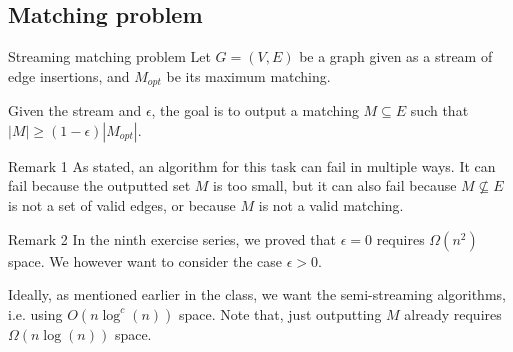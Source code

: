 \documentclass[a4paper]{article}
\begin{document}
\subsection{Matching problem}

\begin{parag}{Streaming matching problem}
    Let $G = \left(V, E\right)$ be a graph given as a stream of edge insertions, and $M_{opt}$ be its maximum matching. 

    Given the stream and $\epsilon$, the goal is to output a matching $M \subseteq E$ such that $\left|M\right| \geq \left(1 - \epsilon\right) \left|M_{opt}\right|$. 

    \begin{subparag}{Remark 1}
        As stated, an algorithm for this task can fail in multiple ways. It can fail because the outputted set $M$ is too small, but it can also fail because $M \not\subseteq E$ is not a set of valid edges, or because $M$ is not a valid matching.
    \end{subparag}

    \begin{subparag}{Remark 2}
        In the ninth exercise series, we proved that $\epsilon = 0$ requires $\Omega\left(n^2\right)$ space. We however want to consider the case $\epsilon > 0$.

        Ideally, as mentioned earlier in the class, we want the semi-streaming algorithms, i.e. using $O\left(n \log^c\left(n\right)\right)$ space. Note that, just outputting $M$ already requires $\Omega\left(n \log\left(n\right)\right)$ space. 
    \end{subparag}
\end{parag}
\end{document}
